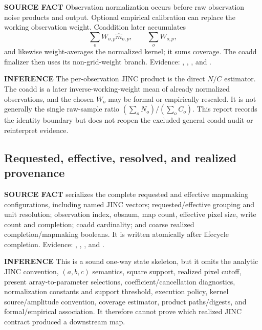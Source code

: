 \documentclass[10pt]{article}
\newcommand{\srclabel}{\textbf{SOURCE FACT}}
\newcommand{\inflabel}{\textbf{INFERENCE}}
\begin{document}
\srclabel{} Observation normalization occurs before raw observation noise
products and output.  Optional empirical calibration can replace the working
observation weight.  Coaddition later accumulates
\begin{equation}
 \sum_o W_{o,p}\widehat m_{o,p},\qquad \sum_o W_{o,p},
\end{equation}
and likewise weight-averages the normalized kernel; it sums coverage.  The
coadd finalizer then uses its non-grid-weight branch.  Evidence:
,
,
, and
.

\inflabel{} The per-observation JINC product is the direct $N/C$ estimator.
The coadd is a later inverse-working-weight mean of already normalized
observations, and the chosen $W_o$ may be formal or empirically rescaled.  It
is not generally the single raw-sample ratio $(\sum_oN_o)/(\sum_oC_o)$.
This report records the identity boundary but does not reopen the excluded
general coadd audit or reinterpret  evidence.

\subsection{Requested, effective, resolved, and realized provenance}

\srclabel{}  serializes the complete requested
and effective mapmaking configurations, including named JINC vectors;
requested/effective grouping and unit resolution; observation index, obsnum,
map count, effective pixel size, write count and completion; coadd
cardinality; and coarse realized completion/mapmaking booleans.  It is written
atomically after lifecycle completion.  Evidence:
,
,
, and
.

\inflabel{} This is a sound one-way state skeleton, but it omits the analytic
JINC convention, $(a,b,c)$ semantics, square support, realized pixel cutoff,
present array-to-parameter selections, coefficient/cancellation diagnostics,
normalization constants and support threshold, execution policy, kernel
source/amplitude convention, coverage estimator, product paths/digests, and
formal/empirical association.  It therefore cannot prove which realized JINC
contract produced a downstream map.
\end{document}

